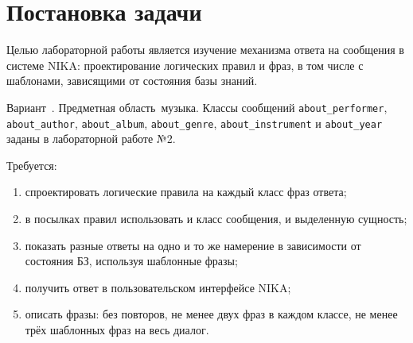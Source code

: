 \section{Постановка задачи}
\label{sec:task}

Целью лабораторной работы является изучение механизма ответа на сообщения в системе NIKA: проектирование логических правил и фраз, в том числе с шаблонами, зависящими от состояния базы знаний.

Вариант~. Предметная область~\mdash  музыка. Классы сообщений \texttt{about\_performer}, \texttt{about\_author}, \texttt{about\_album}, \texttt{about\_genre}, \texttt{about\_instrument} и \texttt{about\_year} заданы в лабораторной работе №2.

Требуется:
\begin{enumerate}
	\item спроектировать логические правила на каждый класс фраз ответа;
	\item в посылках правил использовать и класс сообщения, и выделенную сущность;
	\item показать разные ответы на одно и то же намерение в зависимости от состояния БЗ, используя шаблонные фразы;
	\item получить ответ в пользовательском интерфейсе NIKA;
	\item описать фразы: без повторов, не менее двух фраз в каждом классе, не менее трёх шаблонных фраз на весь диалог.
\end{enumerate}
